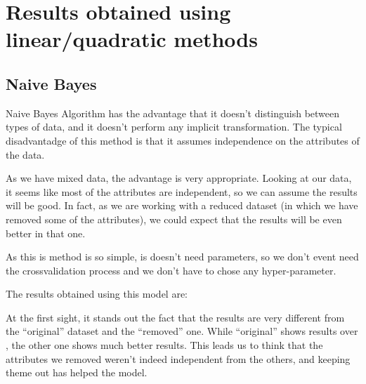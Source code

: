 %
\section{Results obtained using linear/quadratic methods}


\subsection{Naive Bayes}

Naive Bayes Algorithm has the advantage that it doesn't distinguish between types of data, and it doesn't perform any implicit transformation. The typical disadvantadge of this method is that it assumes independence on the attributes of the data.

As we have mixed data, the advantage is very appropriate. Looking at our data, it seems like most of the attributes are independent, so we can assume the results will be good. In fact, as we are working with a reduced dataset (in which we have removed some of the attributes), we could expect that the results will be even better in that one.

As this is method is so simple, is doesn't need parameters, so we don't event need the crossvalidation process and we don't have to chose any hyper-parameter.

The results obtained using this model are:


At the first sight, it stands out the fact that the results are very different from the ``original'' dataset and the ``removed'' one. While ``original'' shows results over , the other one shows much better results. This leads us to think that the attributes we removed weren't indeed independent from the others, and keeping theme out has helped the model.

